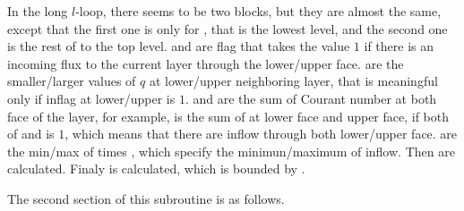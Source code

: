 %
In the long $l$-loop, there seems to be two blocks, but they are almost
the same, except that the first one is only for , that is the
lowest level, and the second one is the rest of  to the top level.
%
 and  are flag that takes the value $1$ if there is an
incoming flux to the current layer through the lower/upper face.
%
 are the smaller/larger values of $q$ at lower/upper
neighboring layer, that is meaningful only if inflag at lower/upper is $1$.
%
 and  are the sum of Courant number at both face of
the layer, for example,  is the sum of  at lower face
and upper face, if both of  and  is $1$, which
means that there are inflow through both lower/upper face.
%
 are the min/max of  times , which
specify the minimun/maximum of inflow.
%
Then  are calculated.
%
Finaly  is calculated, which is bounded by .


The second section of this subroutine is as follows.

